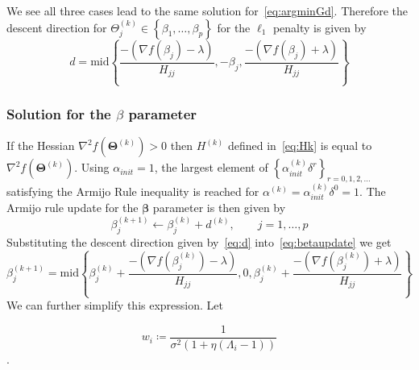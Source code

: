 \documentclass[12pt,letter]{article}\usepackage[]{graphicx}\usepackage[]{color}
\newcommand{\tm}[1]{\textrm{{#1}}}
\newcommand{\bX}{\textbf{X}}
\newcommand{\bXtilde}{\widetilde{\bX}}
\newcommand{\bTheta}{\boldsymbol{\Theta}}
\newcommand{\bbeta}{\boldsymbol{\beta}}
\begin{document}
We see all three cases lead to the same solution for~\eqref{eq:argminGd}. Therefore the descent direction for $\Theta_j^{(k)} \in \left\lbrace \beta_1, \ldots, \beta_p \right\rbrace$ for the $\ell_1$ penalty is given by
\begin{equation}
	d = \tm{mid}\left\lbrace \frac{-(\nabla f(\beta_{j}) - \lambda)}{H_{j j}}, -\beta_j ,\frac{-(\nabla f(\beta_{j}) + \lambda)}{H_{j j}} \right\rbrace  \label{eq:d}
\end{equation}

\subsubsection{Solution for the $\beta$ parameter}
If the Hessian $\nabla^2f(\bTheta^{(k)}) >0$ then $H^{(k)}$ defined in~\eqref{eq:Hk} is equal to $\nabla^2f(\bTheta^{(k)})$. Using $\alpha_{init} = 1$, the largest element of $\left\lbrace \alpha_{init}^{(k)} \delta^r \right\rbrace_{r = 0, 1, 2, \ldots}$ satisfying the Armijo Rule inequality is reached for $\alpha^{(k)} = \alpha_{init}^{(k)}\delta^0 = 1$. The Armijo rule update for the $\bbeta$ parameter is then given by
\begin{equation}
	\beta_j^{(k+1)} \leftarrow \beta_j^{(k)} + d^{(k)}, \qquad j=1, \ldots, p \label{eq:betaupdate}
\end{equation}
Substituting the descent direction given by~\eqref{eq:d} into~\eqref{eq:betaupdate} we get
\begin{equation}
	\beta_j^{(k+1)} = \tm{mid}\left\lbrace \beta_j^{(k)}+ \frac{-(\nabla f(\beta_j^{(k)}) - \lambda)}{H_{j j}}, 0,\beta_j^{(k)}+ \frac{-(\nabla f(\beta_j^{(k)}) + \lambda)}{H_{j j}}  \right\rbrace \label{eq:betaMidpoint}
\end{equation}
We can further simplify this expression. Let %

\begin{equation}
	w_i \coloneqq \frac{1}{\sigma^2\left(1+\eta(\Lambda_i-1)\right)}
\end{equation}.
\end{document}
